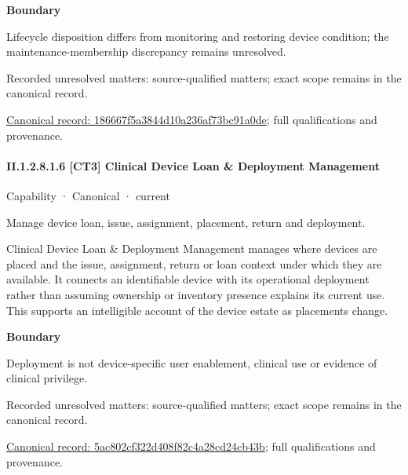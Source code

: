 \textbf{Boundary}



Lifecycle disposition differs from monitoring and restoring device condition; the maintenance-membership discrepancy remains unresolved.


{\small Recorded unresolved matters: source-qualified matters; exact scope remains in the canonical record.}\par
{\footnotesize \href{../../../../continuum/strategy/capability/186667f5a3844d10a236af73bc91a0de.md}{Canonical record: 186667f5a3844d10a236af73bc91a0de}; full qualifications and provenance.}\par
\paragraph*{II.1.2.8.1.6 [CT3] Clinical Device Loan \& Deployment Management}
\label{navigation:II.1.2.8.1.6}

\label{element:5ac802cf322d408f82c4a28cd24cb43b}
{\small Capability · Canonical · current}\par

Manage device loan, issue, assignment, placement, return and deployment.



Clinical Device Loan \& Deployment Management manages where devices are placed and the issue, assignment, return or loan context under which they are available. It connects an identifiable device with its operational deployment rather than assuming ownership or inventory presence explains its current use. This supports an intelligible account of the device estate as placements change.



\textbf{Boundary}



Deployment is not device-specific user enablement, clinical use or evidence of clinical privilege.


{\small Recorded unresolved matters: source-qualified matters; exact scope remains in the canonical record.}\par
{\footnotesize \href{../../../../continuum/strategy/capability/5ac802cf322d408f82c4a28cd24cb43b.md}{Canonical record: 5ac802cf322d408f82c4a28cd24cb43b}; full qualifications and provenance.}\par
